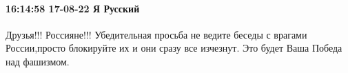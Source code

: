  
 
 
 
 

\paragraph{16:14:58 17-08-22 Я Русский}

Друзья!!! Россияне!!! Убедительная просьба не ведите беседы с врагами
России,просто блокируйте их и они сразу все изчезнут. Это будет Ваша Победа над
фашизмом.
